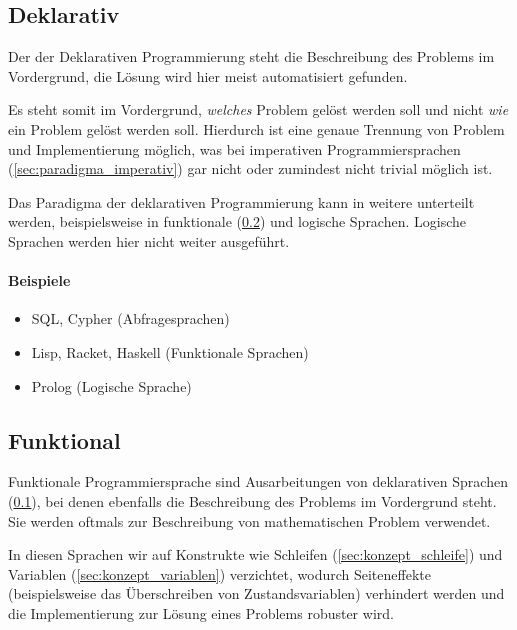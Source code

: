 \subsection{Deklarativ}
    \label{sec:paradigma_deklarativ}

    Der der Deklarativen Programmierung steht die Beschreibung des Problems im Vordergrund, die Lösung wird hier meist automatisiert gefunden.
    
    Es steht somit im Vordergrund, \textit{welches} Problem gelöst werden soll und nicht \textit{wie} ein Problem gelöst werden soll. Hierdurch ist eine genaue Trennung von Problem und Implementierung möglich, was bei imperativen Programmiersprachen (\ref{sec:paradigma_imperativ}) gar nicht oder zumindest nicht trivial möglich ist.
    
    Das Paradigma der deklarativen Programmierung kann in weitere unterteilt werden, beispielsweise in funktionale (\ref{sec:paradigma_funktional}) und logische Sprachen. Logische Sprachen werden hier nicht weiter ausgeführt.
    
    \paragraph{Beispiele}
        \begin{itemize}
            \item SQL, Cypher (Abfragesprachen)
            \item Lisp, Racket, Haskell (Funktionale Sprachen)
            \item Prolog (Logische Sprache)
        \end{itemize}

\subsection{Funktional}
    \label{sec:paradigma_funktional}

    Funktionale Programmiersprache sind Ausarbeitungen von deklarativen Sprachen (\ref{sec:paradigma_deklarativ}), bei denen ebenfalls die Beschreibung des Problems im Vordergrund steht. Sie werden oftmals zur Beschreibung von mathematischen Problem verwendet.
    
    In diesen Sprachen wir auf Konstrukte wie Schleifen (\ref{sec:konzept_schleife}) und Variablen (\ref{sec:konzept_variablen}) verzichtet, wodurch Seiteneffekte (beispielsweise das Überschreiben von Zustandsvariablen) verhindert werden und die Implementierung zur Lösung eines Problems robuster wird.
    

